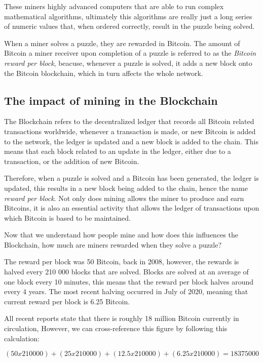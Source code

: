 \documentclass{article}
\newcommand\tab[1][1cm]{\hspace*{#1}}
\begin{document}
These miners highly advanced computers that are able to run complex mathematical algorithms, ultimately this algorithms are really just a long series of numeric values that, when ordered correctly, result in the puzzle being solved.

When a miner solves a puzzle, they are rewarded in Bitcoin. The amount of Bitcoin a miner receiver upon completion of a puzzle is referred to as the \textit{Bitcoin reward per block}, beacuse, whenever a puzzle is solved, it adds a new block onto the Bitcoin blockchain, which in turn affects the whole network.

\subsection{The impact of mining in the Blockchain}

\tab The Blockchain refers to the decentralized ledger that records all Bitcoin related transactions worldwide, whenever a transaction is made, or new Bitcoin is added to the network, the ledger is updated and a new block is added to the chain. This means that each block related to an update in the ledger, either due to a transaction, or the addition of new Bitcoin.

Therefore, when a puzzle is solved and a Bitcoin has been generated, the ledger is updated, this results in a new block being added to the chain, hence the name \textit{reward per block}. Not only does mining allows the miner to produce and earn Bitcoins, it is also an essential activity that allows the ledger of transactions upon which Bitcoin is based to be maintained.

Now that we understand how people mine and how does this influences the Blockchain, how much are miners rewarded when they solve a puzzle?

The reward per block was 50 Bitcoin, back in 2008, however, the rewards is halved every 210 000 blocks that are solved. Blocks are solved at an average of one block every 10 minutes, this means that the reward per block halves around every 4 years. The most recent halving occurred in July of 2020, meaning that current reward per block is 6.25 Bitcoin.

All recent reports state that there is roughly 18 million Bitcoin currently in circulation, However, we can cross-reference this figure by following this calculation:

\[(50 x 210 000) + (25 x 210 000) + (12.5 x 210 000) + (6.25 x 210 000) = 18 375 000\]
\end{document}
